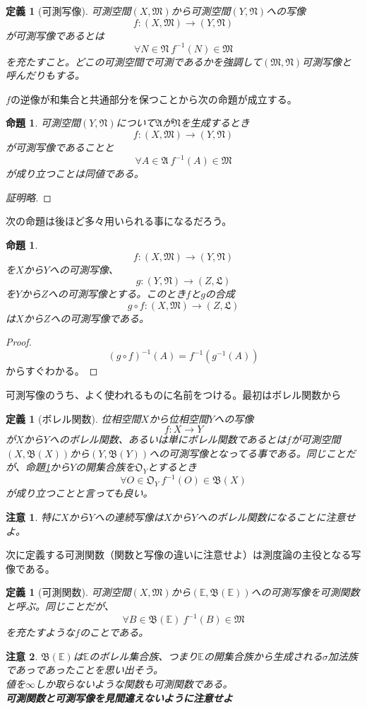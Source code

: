 \documentclass[leqno]{jsarticle}
\newtheorem{prop}[thm]{命題}
\newtheorem{df}[thm]{定義}
\newtheorem*{cau}{注意}
\newcommand{\mgn}{\infty}
\newcommand{\mm}{\mathfrak{M}}
\newcommand{\rrr}{\mathbb{E}}
\newcommand{\s}{\sigma}
\begin{document}
\begin{df}[可測写像]可測空間$(X,\mathfrak{M})$から可測空間$(Y,\mathfrak{N})$への写像
\[
f:(X,\mm)\to (Y,\mathfrak{N})
\]が可測写像であるとは
\[
\forall N\in \mathfrak{N}\ f^{-1}(N)\in \mm
\]
を充たすこと。どこの可測空間で可測であるかを強調して$(\mm,\mathfrak{N})$可測写像と呼んだりもする。
\end{df}
$f$の逆像が和集合と共通部分を保つことから次の命題が成立する。
\begin{prop}\label{kasoku}可測空間$(Y,\mathfrak{N})$について$\mathfrak{A}$が$\mathfrak{N}$を生成するとき
\[
f:(X,\mm)\to (Y,\mathfrak{N})
\]
が可測写像であることと
\[
\forall A\in \mathfrak{A}\ f^{-1}(A)\in \mm
\]
が成り立つことは同値である。
\end{prop}
\begin{proof}[証明略]
\end{proof}


次の命題は後ほど多々用いられる事になるだろう。
\begin{prop}\label{gousei}
\[
f:(X,\mm)\to (Y,\mathfrak{N})
\]を$X$から$Y$への可測写像、
\[
g:(Y,\mathfrak{N})\to (Z,\mathfrak{L})
\]を$Y$から$Z$への可測写像とする。このとき$f$と$g$の合成
\[
g\circ f:(X,\mm)\to(Z,\mathfrak{L})
\]
は$X$から$Z$への可測写像である。
\end{prop}
\begin{proof}
\[
(g\circ f)^{-1}(A)=f^{-1}(g^{-1}(A))
\]
からすぐわかる。
\end{proof}

可測写像のうち、よく使われるものに名前をつける。最初はボレル関数から
\begin{df}[ボレル関数]位相空間$X$から位相空間$Y$への写像
\[
f:X\to Y
\]
が$X$から$Y$へのボレル関数、あるいは単にボレル関数であるとは$f$が可測空間$(X,\mathfrak{B}(X))$から$(Y,\mathfrak{B}(Y))$への可測写像となってる事である。同じことだが、命題\ref{kasoku}から$Y$の開集合族を$\mathfrak{O}_{Y}$とするとき
\[
\forall O\in \mathfrak{O}_{Y}\ f^{-1}(O)\in \mathfrak{B}(X)
\]
が成り立つことと言っても良い。
\end{df}
\begin{cau}
特に$X$から$Y$への連続写像は$X$から$Y$へのボレル関数になることに注意せよ。
\end{cau}
次に定義する可測関数（関数と写像の違いに注意せよ）は測度論の主役となる写像である。
\begin{df}[可測関数]可測空間$(X,\mm)$から$(\rrr,\mathfrak{B}(\rrr))$への可測写像を可測関数と呼ぶ。同じことだが、
\[
\forall B\in \mathfrak{B}(\rrr)\ f^{-1}(B)\in \mm
\]
を充たすような$f$のことである。
\end{df}
\begin{cau}
$\mathfrak{B}(\rrr)$は$\rrr$のボレル集合族、つまり$\rrr$の開集合族から生成される$\s$加法族であっであったことを思い出そう。\\ 
値を$\mgn$しか取らないような関数も可測関数である。\\ 
{\bf 可測関数と可測写像を見間違えないように注意せよ}
\end{cau}
\end{document}
